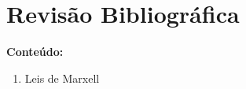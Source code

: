 \pagestyle{empty}
\cleardoublepage
\pagestyle{fancy}

\chapter{Revisão Bibliográfica}\label{Revisao_teorica}

\textbf{Conteúdo:}
\begin{enumerate}
	\item Leis de Marxell
\end{enumerate}